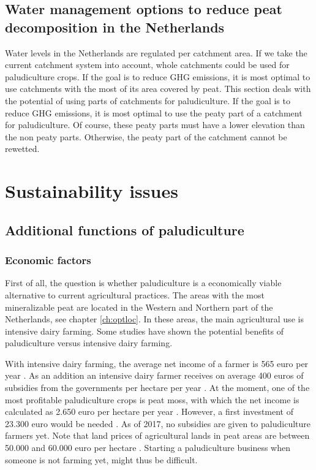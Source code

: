 {\section{Water management options to reduce peat decomposition in the Netherlands}
Water levels in the Netherlands are regulated per catchment area. If we take the current catchment system into account, whole catchments could be used for paludiculture crops. If the goal is to reduce GHG emissions, it is most optimal to use catchments with the most of its area covered by peat. 
This section deals with the potential of using parts of catchments for paludiculture. If the goal is to reduce GHG emissions, it is most optimal to use the peaty part of a catchment for paludiculture. Of course, these peaty parts must have a lower elevation than the non peaty parts. Otherwise, the peaty part of the catchment cannot be rewetted. 

\chapter{Sustainability issues}

\section{Additional functions of paludiculture}

\subsection{Economic factors}
First of all, the question is whether paludiculture is a economically viable alternative to current agricultural practices. The areas with the most mineralizable peat are located in the Western and Northern part of the Netherlands, see chapter \ref{ch:optloc}. In these areas, the main agricultural use is intensive dairy farming. Some studies have shown the potential benefits of paludiculture versus intensive dairy farming. 

With intensive dairy farming, the average net income of a farmer is 565 euro per year \citep{van2013rewetting}. As an addition an intensive dairy farmer receives on average 400 euros of subsidies from the governments per hectare per year \citep{van2013rewetting}. At the moment, one of the most profitable paludiculture crops is peat moss, with which the net income is calculated as 2.650 euro per hectare per year \citep{van2013rewetting}. However, a first investment of 23.300 euro would be needed \citep{van2013rewetting}. As of 2017, no subsidies are given to paludiculture farmers yet. Note that land prices of agricultural lands in peat areas are between 50.000 and 60.000 euro per hectare \citep{}. Starting a paludiculture business when someone is not farming yet, might thus be difficult.

}
